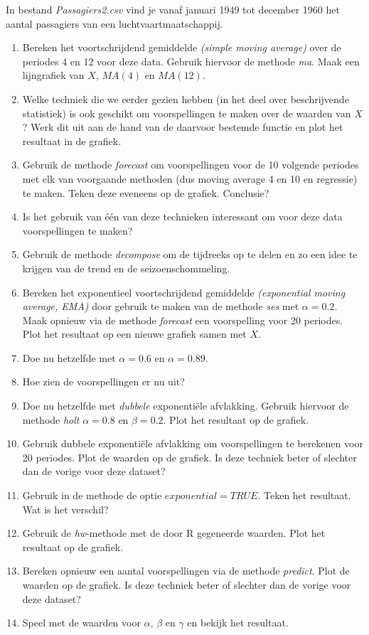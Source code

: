 \begin{exercise}
In bestand \emph{Passagiers2.csv} vind je vanaf januari 1949 tot december 1960 het aantal passagiers van een luchtvaartmaatschappij. 
\begin{enumerate}
  \item Bereken het voortschrijdend gemiddelde \emph{(simple moving average)} over de periodes 4 en 12 voor deze data. Gebruik hiervoor de methode \emph{ma}. Maak een lijngrafiek van $X$, $MA(4)$ en $MA(12)$.
  \item Welke techniek die we eerder gezien hebben (in het deel over beschrijvende statistiek) is ook geschikt om voorspellingen te maken over de waarden van $X$? Werk dit uit aan de hand van de daarvoor bestemde functie en plot het resultaat in de grafiek.
  \item Gebruik de methode \emph{forecast} om voorspellingen voor de 10 volgende periodes met elk van voorgaande methoden (dus moving average 4 en 10 en regressie) te maken. Teken deze eveneens op de grafiek. Conclusie?
  \item Is het gebruik van één van deze technieken interessant om voor deze data voorspellingen te maken? 
  \item Gebruik de methode \emph{decompose} om de tijdreeks op te delen en zo een idee te krijgen van de trend en de seizoenschommeling.
  \item Bereken het exponentieel voortschrijdend gemiddelde \emph{(exponential moving average, EMA)} door gebruik te maken van de methode \emph{ses} met $\alpha=0.2$. Maak opnieuw via de methode \emph{forecast} een voorspelling voor 20 periodes. Plot het resultaat op een nieuwe grafiek samen met $X$.
  \item Doe nu hetzelfde met $\alpha=0.6$ en $\alpha=0.89$. 
  \item Hoe zien de voorspellingen er nu uit?
  \item Doe nu hetzelfde met \emph{dubbele} exponentiële afvlakking. Gebruik hiervoor de methode \emph{holt}  $\alpha =  0.8$ en $\beta = 0.2$. Plot het resultaat op de grafiek.
  \item Gebruik dubbele exponentiële afvlakking om voorspellingen te berekenen voor 20 periodes. Plot de waarden op de grafiek. Is deze techniek beter of slechter dan de vorige voor deze dataset?
  \item Gebruik in de methode de optie $exponential=TRUE$. Teken het resultaat.  Wat is het verschil?
  \item Gebruik de \emph{hw}-methode met de door R gegeneerde waarden. Plot het resultaat op de grafiek.
  \item Bereken opnieuw een aantal voorspellingen via de methode \emph{predict}. Plot de waarden op de grafiek. Is deze techniek beter of slechter dan de vorige voor deze dataset?
  \item Speel met de waarden voor $\alpha$, $\beta$ en $\gamma$ en bekijk het resultaat.
\end{enumerate}

\end{exercise}